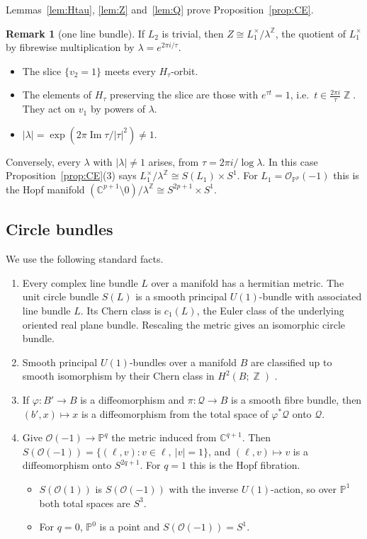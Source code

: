 \documentclass{article}
\DeclareMathOperator{\Z}{\mathbb{Z}}
\theoremstyle{definition}
\newtheorem{remark}[theorem]{Remark}
\theoremstyle{plain}
\newcommand{\C}{\mathbb{C}}
\newcommand{\PP}{\mathbb{P}}
\newcommand{\cO}{\mathcal{O}}
\DeclareMathOperator{\Ima}{Im}
\begin{document}
Lemmas~\ref{lem:Htau}, \ref{lem:Z} and~\ref{lem:Q} prove Proposition~\ref{prop:CE}.

\begin{remark}[one line bundle]\label{rem:onebundle}
If $L_2$ is trivial, then $Z\cong L_1^\times/\lambda^{\Z}$, the quotient of $L_1^\times$ by
fibrewise multiplication by $\lambda=e^{2\pi i/\tau}$.
\begin{itemize}
\item The slice $\{v_2=1\}$ meets every $H_\tau$-orbit.
\item The elements of $H_\tau$ preserving the slice are those with $e^{\tau t}=1$, i.e.\
  $t\in\frac{2\pi i}{\tau}\Z$. They act on $v_1$ by powers of $\lambda$.
\item $|\lambda|=\exp(2\pi\Ima\tau/|\tau|^2)\neq1$.
\end{itemize}
Conversely, every $\lambda$ with $|\lambda|\neq1$ arises, from $\tau=2\pi i/\log\lambda$. In
this case Proposition~\ref{prop:CE}(3) says $L_1^\times/\lambda^{\Z}\cong S(L_1)\times S^1$.
For $L_1=\cO_{\PP^{p}}(-1)$ this is the Hopf manifold
$(\C^{p+1}\setminus0)/\lambda^{\Z}\cong S^{2p+1}\times S^1$.
\end{remark}

\subsection{Circle bundles}\label{sec:circlebundles}
We use the following standard facts.
\begin{enumerate}
\item[(C1)] Every complex line bundle $L$ over a manifold has a hermitian metric. The
  unit circle bundle $S(L)$ is a smooth principal $U(1)$-bundle with associated line
  bundle $L$. Its Chern class is $c_1(L)$, the Euler class of the underlying oriented
  real plane bundle. Rescaling the metric gives an isomorphic circle bundle.
\item[(C2)] Smooth principal $U(1)$-bundles over a manifold $B$ are classified up to
  smooth isomorphism by their Chern class in $H^2(B;\Z)$ \cite{Husemoller}.
\item[(C3)] If $\varphi\colon B'\to B$ is a diffeomorphism and $\pi\colon\mathcal Q\to B$ is a
  smooth fibre bundle, then $(b',x)\mapsto x$ is a diffeomorphism from the total space of
  $\varphi^*\mathcal Q$ onto $\mathcal Q$.
\item[(C4)] Give $\cO(-1)\to\PP^q$ the metric induced from $\C^{q+1}$. Then
  $S(\cO(-1))=\{(\ell,v):v\in\ell,\ |v|=1\}$, and $(\ell,v)\mapsto v$ is a diffeomorphism
  onto $S^{2q+1}$. For $q=1$ this is the Hopf fibration.
  \begin{itemize}
  \item $S(\cO(1))$ is $S(\cO(-1))$ with the inverse $U(1)$-action, so over $\PP^1$
    both total spaces are $S^3$.
  \item For $q=0$, $\PP^0$ is a point and $S(\cO(-1))=S^1$.
  \end{itemize}
\end{enumerate}
\end{document}

